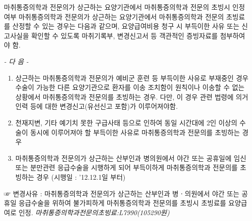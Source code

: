 \par
\medskip
{} 

\begin{commentbox}{마취통증의학과 전문의가 상근하는 요양기관에서 마취통증의학과 전문의 초빙시 인정여부}
마취통증의학과 전문의가 상근하는 요양기관에서 마취통증의학과 전문의 초빙료를 산정할 수 있는 경우는 다음과 같으며, 요양급여비용 청구 시 부득이한 사유 또는 신고사실을 확인할 수 있도록 마취기록부, 변경신고서 등 객관적인 증빙자료를 첨부하여야 함. 
\begin{center}\emph{- 다 음 -}\end{center}
\begin{enumerate}[가.]\tightlist
\item 상근하는 마취통증의학과 전문의가 예비군 훈련 등 부득이한 사유로 부재중인 경우 수술이 가능한 다른 요양기관으로 환자를 이송 조치함이 원칙이나 이송할 수 없는 상황에서 마취통증의학과 전문의를 초빙하는 경우. 다만, 이 경우 관련 법령에 의거 인력 등에 대한 변경신고(유선신고 포함)가 이루어져야함. 
\item  천재지변, 기타 예기치 못한 구급사태 등으로 인하여 동일 시간대에 2인 이상의 수술이 동시에 이루어져야 할 부득이한 사유로 마취통증의학과 전문의를 초빙하는 경우
\item 마취통증의학과 전문의가 상근하는 산부인과 병의원에서 야간 또는 공휴일에 임신 또는 분만관련 응급수술을 시행하게 되어 부득이하게 마취통증의학과 전문의를 초빙하는 경우\newline
(시행일 : '12.12.1일 부터)
\end{enumerate}  
☞ 변경사유 : 마취통증의학과 전문의가 상근하는 산부인과 병ㆍ의원에서 야간 또는 공휴일 응급수술을 위하여 불가피하게 마취통증의학과 전문의를 초빙시 초빙료를 요양급여로 인정. \emph{마취통증의학과전문의초빙료:L7990(105290원)}
\end{commentbox}

